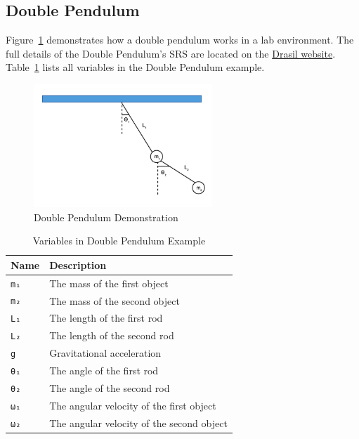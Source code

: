 \subsection{Double Pendulum}
\label{se_dblpen}
Figure~\ref{fig_dblpen} demonstrates how a double pendulum works in a lab environment. The full details of the Double Pendulum's SRS are located on the \href{https://jacquescarette.github.io/Drasil/examples/dblpendulum/SRS/srs/DblPendulum_SRS.html}{Drasil website}. Table~\ref{tab_dblpendes} lists all variables in the Double Pendulum example.
\begin{figure}[ht]
  \centering
  \includegraphics[width=0.6\textwidth]{figures/DblPendulum.png}
  \caption{Double Pendulum Demonstration}
  \label{fig_dblpen}
\end{figure}

\begin{table}[ht]
	\begin{tabular}{ p{} p{} }
		\textbf{Name} & \textbf{Description} \\
		\toprule
		\verb|m₁| & The mass of the first object\\
    \verb|m₂| & The mass of the second object\\
		\verb|L₁| & The length of the first rod\\
		\verb|L₂| & The length of the second rod\\
		\verb|g| & Gravitational acceleration\\
		\verb|θ₁| & The angle of the first rod\\
		\verb|θ₂| & The angle of the second rod\\
		\verb|ω₁| & The angular velocity of the first object\\
		\verb|ω₂| & The angular velocity of the second object\\
		\bottomrule	
	\end{tabular}	
	\caption{Variables in Double Pendulum Example}	
	\label{tab_dblpendes}
\end{table}

